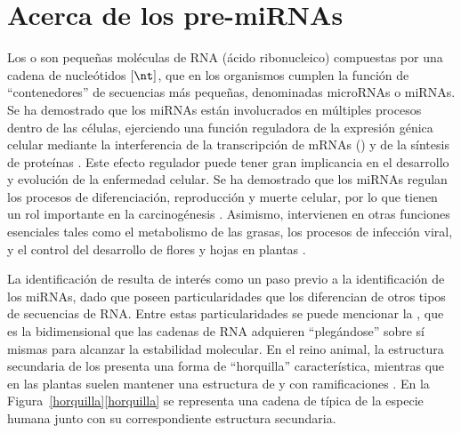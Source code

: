 %
%
%
\section{Acerca de los pre-miRNAs}
%
Los  o  son pequeñas moléculas de RNA
(ácido ribonucleico) compuestas por una cadena de %
nucleótidos $[\nt]$, que en los organismos cumplen la función de
``contenedores'' de secuencias más pequeñas, denominadas microRNAs o
miRNAs.
Se ha demostrado que los miRNAs están involucrados en múltiples
procesos dentro de las células, ejerciendo una función reguladora de
la expresión génica celular mediante la interferencia de la
transcripción de mRNAs () y de la síntesis de
proteínas \cite{lee-mammal} \cite{bartel116} \cite{lili}.
Este efecto regulador puede tener gran implicancia en el desarrollo y
evolución de la enfermedad celular.
Se ha demostrado que los miRNAs regulan los procesos de
diferenciación, reproducción y muerte celular, por lo que tienen un
rol importante en la carcinogénesis \cite{aurora,lili}.
Asimismo, intervienen en otras funciones esenciales tales como el
metabolismo de las grasas, los procesos de infección viral, y el
control del desarrollo de flores y hojas en plantas
\cite{bartel116,lecellier}.

La identificación de  resulta de interés como un paso
previo a la identificación de los miRNAs, dado que poseen
particularidades que los diferencian de otros tipos de secuencias de
RNA.
Entre estas particularidades se puede mencionar la , que es la  bidimensional que las cadenas de
RNA adquieren ``plegándose'' sobre sí mismas para alcanzar la
estabilidad molecular.
En el reino animal, la estructura secundaria de los 
presenta una forma de ``horquilla'' característica, mientras que en
las plantas suelen mantener una estructura de  y 
con ramificaciones \cite{bartel116,sewer}.
En la \iflatexml{}Figura~\ref{horquilla}\else\autoref{horquilla}\fi{}
se representa una cadena de \premirna{} típica de la especie humana
junto con su correspondiente estructura secundaria.
